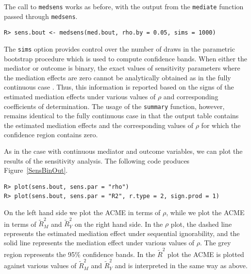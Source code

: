 \documentclass[11pt,letterpaper]{article}
\theoremstyle{plain}
\begin{document}
The call to \texttt{medsens} works as before, with the output from the \texttt{mediate}
function passed through \texttt{medsens}.
\begin{verbatim}
R> sens.bout <- medsens(med.bout, rho.by = 0.05, sims = 1000)
\end{verbatim}
The \texttt{sims} option provides control over the number of draws in
the parametric bootstrap procedure which is used to compute confidence bands.
When either the mediator or outcome is binary, the exact values of
sensitivity parameters where the mediation effects are zero cannot be analytically
obtained as in the fully continuous case \citep[see][Section 4]{imai:keel:yama:10}.
Thus, this information is reported based on the signs of the estimated mediation
effects under various values of $\rho$ and corresponding coefficients of determination.
The usage of the \texttt{summary} function, however, remains
identical to the fully continuous case
in that the output table contains the estimated mediation
effects and the corresponding values of $\rho$ for which the
confidence region contains zero.

As in the case with continuous mediator and outcome variables, we can plot the
results of the sensitivity analysis.  The following code produces Figure~\ref{SensBinOut}.
\begin{verbatim}
R> plot(sens.bout, sens.par = "rho")
R> plot(sens.bout, sens.par = "R2", r.type = 2, sign.prod = 1)
\end{verbatim}
On the left hand side we plot the ACME in terms of $\rho$, while we plot the ACME
in terms of $\widetilde{R}^2_M$ and $\widetilde{R}^2_Y$ on the right hand side.
In the $\rho$ plot, the dashed line represents the estimated mediation effect
under sequential
ignorability, and the solid line represents the mediation effect under
various values of $\rho$.  The grey region represents the 95\%
confidence bands. In the $\widetilde{R}^2$ plot the ACME is plotted against various values of $\widetilde{R}^2_M$ and $\widetilde{R}^2_Y$ and is interpreted in the same way as above.
\end{document}
